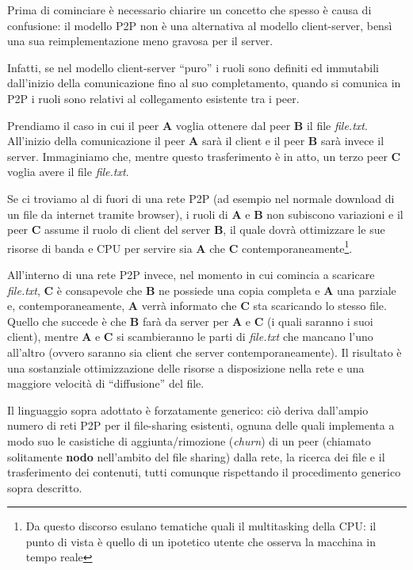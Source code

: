 Prima di cominciare è necessario chiarire un concetto che spesso è causa di confusione: il modello P2P non è una alternativa al modello client-server, bensì una sua reimplementazione meno gravosa per il server.

Infatti, se nel modello client-server ``puro'' i ruoli sono definiti ed immutabili dall'inizio della comunicazione fino al suo completamento, quando si comunica in P2P i ruoli sono relativi al collegamento esistente tra i peer.

Prendiamo il caso in cui il peer \textbf{A} voglia ottenere dal peer \textbf{B} il file \emph{file.txt}. All'inizio della comunicazione il peer \textbf{A} sarà il client e il peer \textbf{B} sarà invece il server. Immaginiamo che, mentre questo trasferimento è in atto, un terzo peer \textbf{C} voglia avere il file \emph{file.txt}.

Se ci troviamo al di fuori di una rete P2P (ad esempio nel normale download di un file da internet tramite browser), i ruoli di \textbf{A} e \textbf{B} non subiscono variazioni e il peer \textbf{C} assume il ruolo di client del server \textbf{B}, il quale dovrà ottimizzare le sue risorse di banda e CPU per servire sia \textbf{A} che \textbf{C} contemporaneamente\footnote{Da questo discorso esulano tematiche quali il multitasking della CPU: il punto di vista è quello di un ipotetico utente che osserva la macchina in tempo reale}.

All'interno di una rete P2P invece, nel momento in cui comincia a scaricare \emph{file.txt}, \textbf{C} è consapevole che \textbf{B} ne possiede una copia completa e \textbf{A} una parziale e, contemporaneamente, \textbf{A} verrà informato che \textbf{C} sta scaricando lo stesso file. Quello che succede è che \textbf{B} farà da server per \textbf{A} e \textbf{C} (i quali saranno i suoi client), mentre \textbf{A} e \textbf{C} si scambieranno le parti di \emph{file.txt} che mancano l'uno all'altro (ovvero saranno sia client che server contemporaneamente). Il risultato è una sostanziale ottimizzazione delle risorse a disposizione nella rete e una maggiore velocità di ``diffusione'' del file.

Il linguaggio sopra adottato è forzatamente generico: ciò deriva dall'ampio numero di reti P2P per il file-sharing esistenti, ognuna delle quali implementa a modo suo le casistiche di aggiunta/rimozione (\emph{\gls{churn}}) di un peer (chiamato solitamente \textbf{nodo} nell'ambito del file sharing) dalla rete, la ricerca dei file e il trasferimento dei contenuti, tutti comunque rispettando il procedimento generico sopra descritto.

